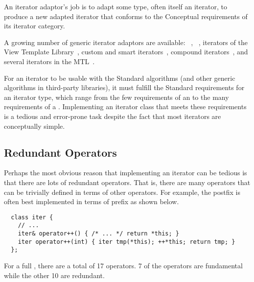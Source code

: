 \documentclass{netobjectdays}
\begin{document}

An iterator adaptor's job is to adapt some  type, often
itself an iterator, to produce a new adapted iterator that conforms to
the Conceptual requirements of its iterator category.


A growing number of generic iterator adaptors are available:
~\cite{iso98:_cpp_final_draft_standard},
~\cite{stroustrup00:_cpp_prog_lang}, iterators of
the View Template Library~\cite{TMPW00:Weiser}, custom and smart
iterators~\cite{becker98:_smart_iteraters,TMPW00:Baus}, compound
iterators~\cite{alexandrescu98:_compound_iters}, and several iterators
in the MTL~\cite{siek99:_scitools}.

For an iterator to be usable with the Standard algorithms (and other
generic algorithms in third-party libraries), it must fulfill the
Standard requirements for an iterator type, which range from the few
requirements of an  to the many requirements
of a . Implementing an iterator class
that meets these requirements is a tedious and error-prone task
despite the fact that most iterators are conceptually simple.

\subsection{Redundant Operators}

Perhaps the most obvious reason that implementing an iterator can
be tedious is that there are lots of redundant operators.  That is,
there are many operators that can be trivially defined in terms of
other operators. For example, the postfix  is often best
implemented in terms of prefix  as shown below.

{\footnotesize
\begin{verbatim}
  class iter {
    // ...
    iter& operator++() { /* ... */ return *this; }
    iter operator++(int) { iter tmp(*this); ++*this; return tmp; }
  };
\end{verbatim}
}

For a full , there are a total of 17
operators. 7 of the operators are fundamental while the other 10 are
redundant.
\end{document}
